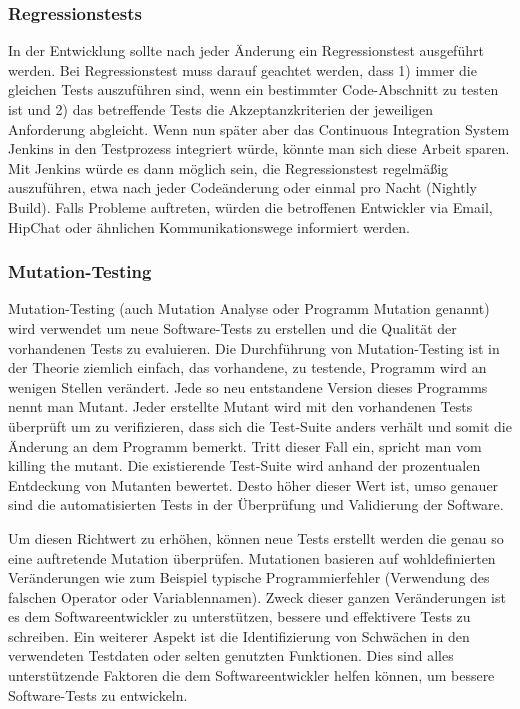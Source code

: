 \subsubsection{Regressionstests}
In der Entwicklung sollte nach jeder Änderung ein Regressionstest ausgeführt werden. Bei Regressionstest muss darauf geachtet werden, dass 1) immer die gleichen Tests auszuführen sind, wenn ein bestimmter Code-Abschnitt zu testen ist und 2) das betreffende Tests die Akzeptanzkriterien der jeweiligen Anforderung abgleicht. Wenn nun später aber das Continuous Integration System Jenkins in den Testprozess integriert würde, könnte man sich diese Arbeit sparen. Mit Jenkins würde es dann möglich sein, die Regressionstest regelmäßig auszuführen, etwa nach jeder Codeänderung oder einmal pro Nacht (Nightly Build). Falls Probleme auftreten, würden die betroffenen Entwickler via Email, HipChat oder ähnlichen Kommunikationswege informiert werden.

\subsubsection{Mutation-Testing}\label{mutation-testing}

Mutation-Testing (auch Mutation Analyse oder Programm Mutation genannt) wird verwendet um neue Software-Tests zu erstellen und die Qualität der vorhandenen Tests zu evaluieren. Die Durchführung von Mutation-Testing ist in der Theorie ziemlich einfach, das vorhandene, zu testende, Programm wird an wenigen Stellen verändert. Jede so neu entstandene Version dieses Programms nennt man Mutant. Jeder erstellte Mutant wird mit den vorhandenen Tests überprüft um zu verifizieren, dass sich die Test-Suite anders verhält und somit die Änderung an dem Programm bemerkt. Tritt dieser Fall ein, spricht man vom \dq{}killing the mutant\dq{}. Die existierende Test-Suite wird anhand der prozentualen Entdeckung von Mutanten bewertet. Desto höher dieser Wert ist, umso genauer sind die automatisierten Tests in der Überprüfung und Validierung der Software. 

Um diesen Richtwert zu erhöhen, können neue Tests erstellt werden die genau so eine auftretende Mutation überprüfen. Mutationen basieren auf wohldefinierten Veränderungen wie zum Beispiel typische Programmierfehler (Verwendung des falschen Operator oder Variablennamen). Zweck dieser ganzen Veränderungen ist es dem Softwareentwickler zu unterstützen, bessere und effektivere Tests zu schreiben. Ein weiterer Aspekt ist die Identifizierung von Schwächen in den verwendeten Testdaten oder selten genutzten Funktionen. Dies sind alles unterstützende Faktoren die dem Softwareentwickler helfen können, um bessere Software-Tests zu entwickeln.

